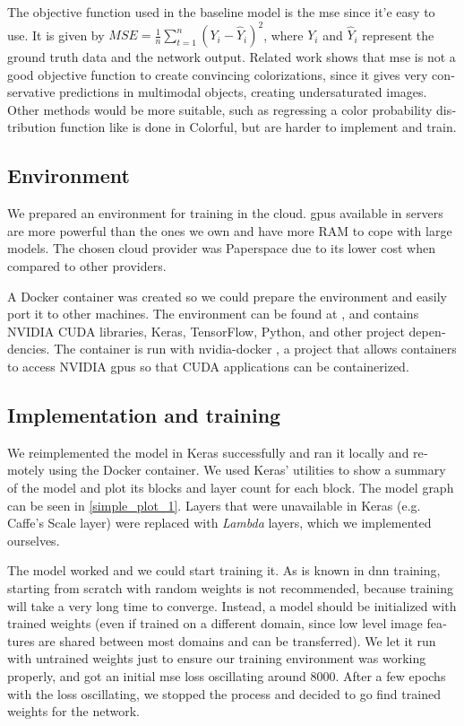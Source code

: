 \documentclass[12pt,openright,oneside,a4paper,english]{abntex2}
\begin{document}
\begin{otherlanguage}{english}
    The objective function used in the baseline model is the \acrshort{mse} since it'e easy to use. It is given by $MSE = \frac{1}{n}\sum_{t=1}^{n}(Y_i - \hat{Y}_i)^2$, where $Y_i$ and $\hat{Y}_i$ represent the ground truth data and the network output. Related work \cite{colorful} shows that \acrshort{mse} is not a good objective function to create convincing colorizations, since it gives very conservative predictions in multimodal objects, creating undersaturated images. Other methods would be more suitable, such as regressing a color probability distribution function like is done in Colorful, but are harder to implement and train.

    \subsection{Environment}

    We prepared an environment for training in the cloud. \acrshort{gpu}s available in servers are more powerful than the ones we own and have more RAM to cope with large models. The chosen cloud provider was Paperspace \cite{paperspace}
    due to its lower cost when compared to other providers.

    A Docker container was created so we could prepare the environment and easily port it to other machines. The environment can be found at \cite{colormotion_docker},
    and contains NVIDIA CUDA libraries, Keras, TensorFlow, Python, and other project dependencies. The container is run with nvidia-docker \cite{nvidia_docker},
    a project that allows containers to access NVIDIA \acrshort{gpu}s so that CUDA applications can be containerized.

    \subsection{Implementation and training}

    We reimplemented the model in Keras successfully and ran it locally and remotely using the Docker container. We used Keras' utilities to show a summary of the model and plot its blocks and layer count for each block. The model graph can be seen in \ref{simple_plot_1}. Layers that were unavailable in Keras (e.g. Caffe's Scale layer) were replaced with \textit{Lambda} layers, which we implemented ourselves.

    The model worked and we could start training it. As is known in \acrshort{dnn} training, starting from scratch with random weights is not recommended, because training will take a very long time to converge. Instead, a model should be initialized with trained weights (even if trained on a different domain, since low level image features are shared between most domains and can be transferred). We let it run with untrained weights just to ensure our training environment was working properly, and got an initial \acrshort{mse} loss oscillating around 8000. After a few epochs with the loss oscillating, we stopped the process and decided to go find trained weights for the network.


\end{otherlanguage}
\end{document}
